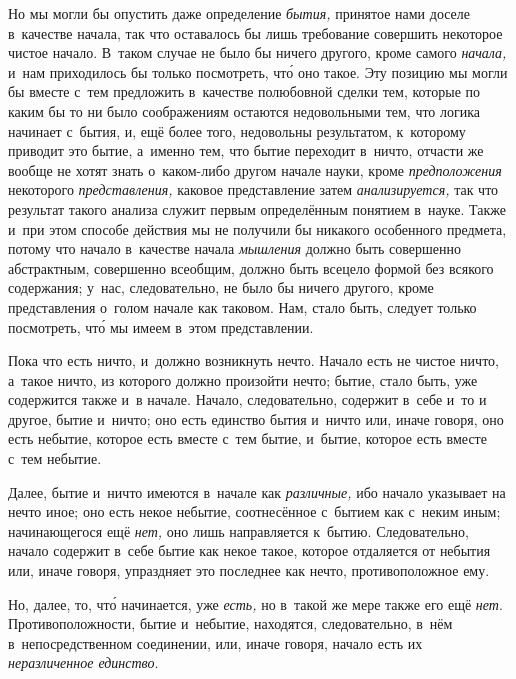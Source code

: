 Но мы могли бы опустить даже определение {\em бытия,} принятое нами доселе
в~качестве начала, так что оставалось бы лишь требование совершить некоторое
чистое начало. В~таком случае не было бы ничего другого, кроме самого
{\em начала,} и~нам приходилось бы только посмотреть, чт\'{о} оно такое. Эту
позицию мы могли бы вместе с~тем предложить в~качестве полюбовной сделки тем,
которые по каким бы то ни было соображениям остаются недовольными тем, что
логика начинает с~бытия, и, ещё более того, недовольны результатом, к~которому
приводит это бытие, а~именно тем, что бытие переходит в~ничто, отчасти же
вообще не хотят знать о~каком-либо другом начале науки, кроме
{\em предположения} некоторого {\em представления,} каковое представление затем
{\em анализируется,} так что результат такого анализа служит первым
определённым понятием в~науке. Также и~при этом способе действия мы не получили
бы никакого особенного предмета, потому что начало в~качестве начала
{\em мышления} должно быть совершенно абстрактным, совершенно всеобщим, должно
быть всецело формой без всякого содержания; у~нас, следовательно, не было бы
ничего другого, кроме представления о~голом начале как таковом. Нам, стало
быть, следует только посмотреть, чт\'{о} мы имеем в~этом представлении.

Пока что есть ничто, и~должно возникнуть нечто. Начало есть не чистое ничто,
а~такое ничто, из которого должно произойти нечто; бытие, стало быть, уже
содержится также и~в начале. Начало, следовательно, содержит в~себе и~то и
другое, бытие и~ничто; оно есть единство бытия и~ничто или, иначе говоря,
оно есть небытие, которое есть вместе с~тем бытие, и~бытие, которое есть
вместе с~тем небытие.

Далее, бытие и~ничто имеются в~начале как {\em различные,} ибо начало указывает
на нечто иное; оно есть некое небытие, соотнесённое с~бытием как с~неким иным;
начинающегося ещё {\em нет,} оно лишь направляется к~бытию. Следовательно,
начало содержит в~себе бытие как некое такое, которое отдаляется от небытия
или, иначе говоря, упраздняет это последнее как нечто, противоположное ему.

Но, далее, то, чт\'{о} начинается, уже {\em есть,} но в~такой же мере также его
ещё {\em нет}. Противоположности, бытие и~небытие, находятся, следовательно,
в~нём в~непосредственном соединении, или, иначе говоря, начало есть их
{\em неразличенное единство}.

